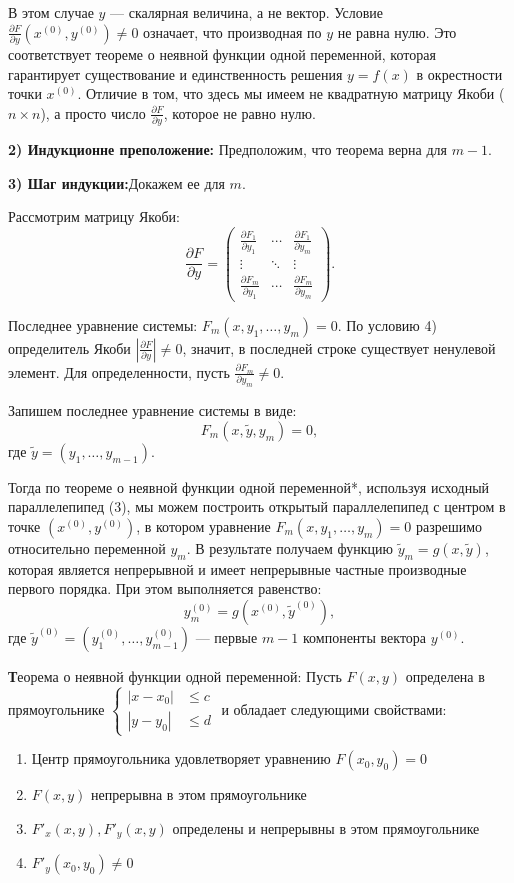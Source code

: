 \documentclass{article}
\begin{document}
В этом случае $y$ — скалярная величина, а не вектор. Условие $\frac{\partial F}{\partial y}(x^{(0)}, y^{(0)}) \neq 0$ означает, что производная по $y$ не равна нулю. Это соответствует теореме о неявной функции одной переменной, которая гарантирует существование и единственность решения $y = f(x)$ в окрестности точки $x^{(0)}$. Отличие в том, что здесь мы имеем не квадратную матрицу Якоби ($n \times n$), а просто число $\frac{\partial F}{\partial y}$, которое не равно нулю.

\textbf{2) Индукционне преположение:} Предположим, что теорема верна для $m-1$.

\textbf{3) Шаг индукции:}Докажем ее для $m$.

Рассмотрим матрицу Якоби:
\[
\frac{\partial F}{\partial y} =
\begin{pmatrix}
\frac{\partial F_1}{\partial y_1} & \cdots & \frac{\partial F_1}{\partial y_m} \\
\vdots & \ddots & \vdots \\
\frac{\partial F_m}{\partial y_1} & \cdots & \frac{\partial F_m}{\partial y_m}
\end{pmatrix}.
\]

Последнее уравнение системы: $F_m(x, y_1, \dots, y_m) = 0$. По условию 4) определитель Якоби $\left| \frac{\partial F}{\partial y} \right| \neq 0$, значит, в последней строке существует ненулевой элемент. Для определенности, пусть $\frac{\partial F_m}{\partial y_m} \neq 0$.

Запишем последнее уравнение системы в виде:
\[
F_m(x, \widetilde{y}, y_m) = 0,
\]
где $\widetilde{y} = (y_1, \dots, y_{m-1})$.

Тогда по теореме о неявной функции одной переменной*, используя исходный параллелепипед (3), мы можем построить открытый параллелепипед с центром в точке $(x^{(0)}, y^{(0)})$, в котором уравнение $F_m(x, y_1, \dots, y_m) = 0$ разрешимо относительно переменной $y_m$. В результате получаем функцию $\widetilde{y}_m = g(x, \widetilde{y})$, которая является непрерывной и имеет непрерывные частные производные первого порядка. При этом выполняется равенство:
\[
y_m^{(0)} = g(x^{(0)}, \widetilde{y}^{(0)}),
\]
где $\widetilde{y}^{(0)} = (y_1^{(0)}, \dots, y_{m-1}^{(0)})$ — первые $m-1$ компоненты вектора $y^{(0)}$.

\newpage

\textbf *Теорема  о неявной функции одной переменной: Пусть $F(x,y)$ определена в прямоугольнике $\left\{
\begin{aligned}
|x - x_0| &\le c \\
|y - y_0| &\le d
\end{aligned}
\right.$ и обладает следующими свойствами:
\begin{enumerate}
    \item Центр прямоугольника удовлетворяет уравнению $F(x_0, y_0) = 0$
    \item $F(x,y)$ непрерывна в этом прямоугольнике
    \item $F'_x(x,y), F'_y(x,y)$ определены и непрерывны в этом прямоугольнике
    \item $F'_y(x_0, y_0) \ne 0$
\end{enumerate}
\end{document}
